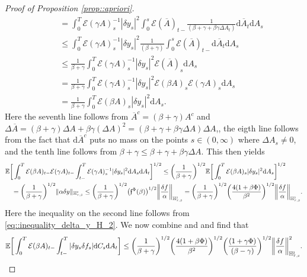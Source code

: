 \documentclass[10pt]{article} %
\newcommand\cE{\mathcal E}
\newcommand{\smalltext}[1]{\text{\fontsize{4}{4}\selectfont$#1$}}
\newcommand\ff{\mathfrak f}
\def \E{\mathbb{E}}
\def \H{\mathbb{H}}
\newcommand{\1}{\mathbf{1}}
\def\d{\mathrm{d}}
\begin{document}
\begin{proof}[Proof of Proposition \ref{prop::apriori}]
\begin{align}
	&\quad = \int_0^T \cE(\gamma A)^{-1}_s |\delta y_s|^2  \int_0^s \cE(\overline A)_{t-} \frac{1}{(\beta + \gamma + \beta\gamma\Delta A_t)} \d\overline A_t \d A_s \nonumber\\
	&\quad \leq \int_0^T \cE(\gamma A)^{-1}_s |\delta y_s|^2 \frac{1}{(\beta + \gamma)} \int_0^s \cE(\overline A)_{t-} \d\overline A_t \d A_s \nonumber\\
	&\quad \leq \frac{1}{\beta+\gamma} \int_0^T \cE(\gamma A)^{-1}_s |\delta y_s|^2 \cE(\overline A)_{s} \d A_s \nonumber\\
	&\quad = \frac{1}{\beta+\gamma} \int_0^T \cE(\gamma A)^{-1}_s |\delta y_s|^2 \cE(\beta A)_s \cE(\gamma A)_s \d A_s \nonumber\\
	&\quad = \frac{1}{\beta+\gamma} \int_0^T \cE(\beta A)_s |\delta y_s|^2  \d A_s.
\end{align}
Here the seventh line follows from $\overline A^c = (\beta + \gamma) A^c$ and $\Delta \overline A = (\beta + \gamma)\Delta A + \beta\gamma(\Delta A)^2 = (\beta + \gamma + \beta\gamma\Delta A)\Delta A$,, the eigth line follows from the fact that $\d\overline A^c$ puts no mass on the points $s \in (0,\infty)$ where $\Delta A_s \neq 0$, and the tenth line follows from $\beta + \gamma \leq \beta + \gamma + \beta\gamma \Delta A$. This then yields
\begin{align}\label{eq8}
	&\E\bigg[ \int_0^T \cE(\beta A)_{t-}\cE(\gamma A)_{t-}\int_{t-}^T \cE(\gamma A)^{-1}_s |\delta y_s|^2 \d A_s \d A_t \bigg]^{1/2} \leq \bigg(\frac{1}{\beta+\gamma}\bigg)^{1/2}\E\bigg[\int_0^T\cE(\beta A)_s |\delta y_s|^2 \d A_s\bigg]^{1/2} \nonumber\\
	&\quad = \bigg(\frac{1}{\beta + \gamma}\bigg)^{1/2} \|\alpha\delta y\|_{\H^\smalltext{2}_{\smalltext{T}\smalltext{,}\smalltext{\beta}}} 
	\leq \bigg(\frac{1}{\beta + \gamma}\bigg)^{1/2} \big(\ff^\Phi(\beta)\big)^{1/2}\bigg\|\frac{\delta f}{\alpha}\bigg\|_{\H^\smalltext{2}_{\smalltext{T}\smalltext{,}\smalltext{\beta}}}
	= \bigg(\frac{1}{\beta + \gamma}\bigg)^{1/2} \bigg(\frac{4(1+\beta\Phi)}{\beta^2}\bigg)^{1/2}\bigg\|\frac{\delta f}{\alpha}\bigg\|_{\H^\smalltext{2}_{\smalltext{T}\smalltext{,}\smalltext{\beta}}}.
\end{align}
Here the inequality on the second line follows from \eqref{eq::inequality_delta_y_H_2}. We now combine  and  and find that
\begin{equation*}
	\E\bigg[ \int_0^T \cE(\beta A)_{t-}\int_{t-}^T |\delta y_s \delta f_s| \d C_s \d A_t \bigg] 
	\leq \bigg(\frac{1}{\beta + \gamma}\bigg)^{1/2} \bigg(\frac{4(1+\beta\Phi)}{\beta^2}\bigg)^{1/2} \bigg(\frac{(1+\gamma\Phi)}{(\beta-\gamma)}\bigg)^{1/2} \bigg\|\frac{\delta f}{\alpha} \bigg\|^2_{\H^\smalltext{2}_{\smalltext{T}\smalltext{,}\smalltext{\beta}}}.

\end{equation*}
\end{proof}
\end{document}
